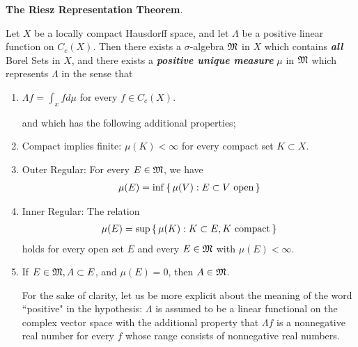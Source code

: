 \documentclass[10pt,a4paper]{report}
\begin{document}
{\newpage
\textbf{The Riesz Representation Theorem}.  

\begin{theorem}
	Let $X$ be a locally compact Hausdorff space, and let $\Lambda$ be a positive linear function on $C_c(X)$.  Then there exists a $\sigma$-algebra $\mathfrak{M}$ in $X$ which contains \textbf{\textit{all}} Borel Sets in $X$, and there exists a \textbf{\textit{positive unique measure}} $\mu$ in $\mathfrak{M}$ which represents $\Lambda$ in the sense that
	\begin{enumerate}[label=(\alph*)]
		\item $\Lambda f = \int_x f d\mu$ for every $f\in C_c(X)$.
		
		and which has the following additional properties;
		
		\item Compact implies finite: $\mu(K)<\infty$ for every compact set $K \subset X$.
		\item Outer Regular: For every $E \in \mathfrak{M}$, we have
		\begin{align*}
			\mu(E) = \inf \left \{\, \mu(V): E \subset V \text{ open} \,\right \}
		\end{align*}
		
		\item Inner Regular: The relation
		\begin{align*}
			\mu(E) = \sup \left \{\, \mu(K): K \subset E, K \text{ compact} \,\right \}
		\end{align*}holds for every open set $E$ and every $E \in \mathfrak{M}$ with $\mu(E) < \infty$.
		
		\item If $E \in \mathfrak{M}, A \subset E$, and $\mu(E)=0$, then $A \in \mathfrak{M}$.
		
		
	For the sake of clarity, let us be more explicit about the meaning of the word
``positive" in the hypothesis: $\Lambda$ is assumed to be a linear functional on the complex vector space with the additional property that $\Lambda f$ is a nonnegative real number for every $f$ whose range consists of nonnegative real numbers.


\end{enumerate}
\end{theorem}}
\end{document}
